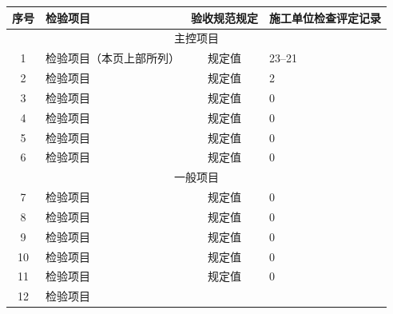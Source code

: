\documentclass[UTF8,10pt,a4paper,fontset=fandol]{ctexart}
\newcommand{\fieldvalue}[1]{#1}
\newcommand{\handwritten}[1]{#1}
\begin{document}
\vspace{0.5em}

\small
\begin{tabularx}{\textwidth}{|c|X|c|X|}
\hline
序号 & 检验项目 & 验收规范规定 & 施工单位检查评定记录 \\
\hline
\multicolumn{4}{|c|}{主控项目} \\
\hline
1 & 检验项目（本页上部所列） &
规定值 &
\fieldvalue{\handwritten{23--21}} \\
\hline
2 & 检验项目 &
规定值 &
\fieldvalue{\handwritten{2}} \\
\hline
3 & 检验项目 &
规定值 &
\fieldvalue{\handwritten{0}} \\
\hline
4 & 检验项目 &
规定值 &
\fieldvalue{\handwritten{0}} \\
\hline
5 & 检验项目 &
规定值 &
\fieldvalue{\handwritten{0}} \\
\hline
6 & 检验项目 &
规定值 &
\fieldvalue{\handwritten{0}} \\
\hline
\multicolumn{4}{|c|}{一般项目} \\
\hline
7 & 检验项目 &
规定值 &
\fieldvalue{\handwritten{0}} \\
\hline
8 & 检验项目 &
规定值 &
\fieldvalue{\handwritten{0}} \\
\hline
9 & 检验项目 &
规定值 &
\fieldvalue{\handwritten{0}} \\
\hline
10 & 检验项目 &
规定值 &
\fieldvalue{\handwritten{0}} \\
\hline
11 & 检验项目 &
规定值 &
\fieldvalue{\handwritten{0}} \\
\hline
12 & 检验项目 &

\end{tabularx}
\end{document}
